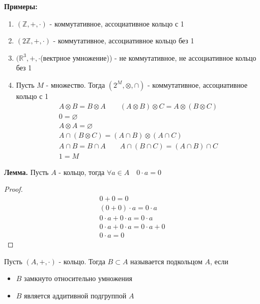 \textbf{Примеры:}
\begin{enumerate}
    \item $(\mathbb{Z}, +, \cdot)$ - коммутативное, ассоциативное кольцо с 1 
    \item $(2\mathbb{Z}, +, \cdot)$ - коммутативное, ассоциативное кольцо без 1
    \item $(\mathbb{R}^3, +, \cdot$(вектрное умножение)) - не коммутативное, не ассоциативное кольцо без 1
    \item Пусть $M$ - множество. Тогда $(2^M, \otimes, \cap)$ - коммутативное, ассоциативное кольцо с 1 
    \begin{gather*}
        A \otimes B = B \otimes A \quad\quad (A \otimes B) \otimes C = A \otimes (B \otimes C) \\
        0 = \varnothing \\
        A \otimes A = \varnothing \\
        A  \cap (B \otimes C) = (A \cap B) \otimes (A \cap C) \\
        A \cap B = B \cap A \quad\quad A \cap (B \cap C) = (A \cap B) \cap C \\
        1 = M
    \end{gather*}
\end{enumerate}
\textbf{Лемма.} Пусть $A$ - кольцо, тогда $\forall a \in A \quad 0 \cdot a = 0$
\begin{proof}
    \begin{gather*}
        0 + 0 = 0 \\
        (0 + 0) \cdot a = 0 \cdot a \\
        0 \cdot a + 0 \cdot a = 0 \cdot a \\
        0 \cdot a + 0 \cdot a = 0 \cdot a + 0 \\
        0 \cdot a = 0
    \end{gather*}
\end{proof}
\begin{conj}
    Пусть $(A, +, \cdot)$ - кольцо. Тогда $B \subset A$ называется подкольцом $A$, если 
    \begin{itemize}
        \item $B$ замкнуто относительно умножения 
        \item $B$ является аддитивной подгруппой $A$
    \end{itemize}
\end{conj}
\vspace{0.7cm}
  
